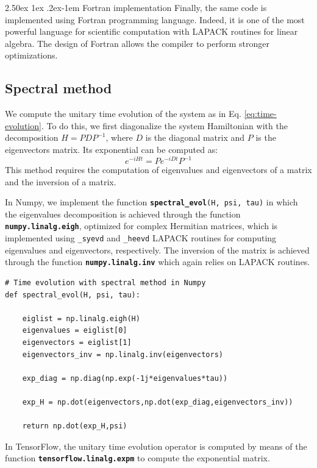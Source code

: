 \documentclass[rmp,10pt,onecolumn,fleqn,notitlepage]{revtex4-1}
\makeatletter
\renewcommand{\paragraph}{%
    \@startsection{paragraph}{4}%
    {\z@}{2.50ex \@plus 1ex \@minus .2ex}{-1em}%
    {\bf\sffamily}%
}
\makeatother
\begin{document}
\paragraph{Fortran implementation}
Finally, the same code is implemented using Fortran programming language. Indeed, it is one of the most powerful language for scientific computation with LAPACK routines for linear algebra. The design of Fortran allows the compiler to perform stronger optimizations. 


\subsection{Spectral method}
\label{subsec:spectral-method}
We compute the unitary time evolution of the system as in Eq. \eqref{eq:time-evolution}. To do this, we first diagonalize the system Hamiltonian with the decomposition $H = PDP^{-1}$, where $D$ is the diagonal matrix and $P$ is the eigenvectors matrix.
Its exponential can be computed as:
\begin{equation}
    e^{-iHt} = P e^{-iDt} P^{-1}
\end{equation}
This method requires the computation of eigenvalues and eigenvectors of a matrix and the inversion of a matrix.

In Numpy, we implement the function {\bfseries\texttt{spectral\_evol}}\texttt{(H, psi, tau)} in which the eigenvalues decomposition is achieved through the function {\bfseries\texttt{numpy.linalg.eigh}}, optimized for complex Hermitian matrices, which is implemented using \texttt{\_syevd} and \texttt{\_heevd} LAPACK routines for computing eigenvalues and eigenvectors, respectively. The inversion of the matrix is achieved through the function {\bfseries\texttt{numpy.linalg.inv}} which again relies on LAPACK routines. 

\begin{lstlisting}[style=myPython]
# Time evolution with spectral method in Numpy
def spectral_evol(H, psi, tau):

    eiglist = np.linalg.eigh(H)
    eigenvalues = eiglist[0]
    eigenvectors = eiglist[1]
    eigenvectors_inv = np.linalg.inv(eigenvectors)
    
    exp_diag = np.diag(np.exp(-1j*eigenvalues*tau))

    exp_H = np.dot(eigenvectors,np.dot(exp_diag,eigenvectors_inv))
    
    return np.dot(exp_H,psi)
\end{lstlisting}

In TensorFlow, the unitary time evolution operator is computed by means of the function {\bfseries\texttt{tensorflow.linalg.expm}} to compute the exponential matrix.
\end{document}
